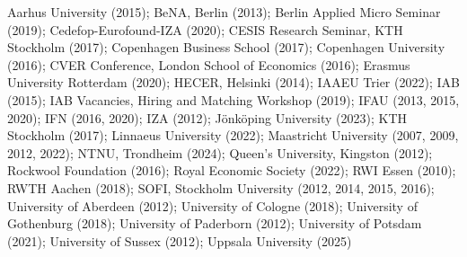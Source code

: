 Aarhus University (2015); BeNA, Berlin (2013); Berlin Applied Micro Seminar (2019); Cedefop-Eurofound-IZA (2020); CESIS Research Seminar, KTH Stockholm (2017); Copenhagen Business School (2017); Copenhagen University (2016); CVER Conference, London School of Economics (2016); Erasmus University Rotterdam (2020); HECER, Helsinki (2014); IAAEU Trier (2022); IAB (2015); IAB Vacancies, Hiring and Matching Workshop (2019); IFAU (2013, 2015, 2020); IFN (2016, 2020); IZA (2012); Jönköping University (2023); KTH Stockholm (2017); Linnaeus University (2022); Maastricht University (2007, 2009, 2012, 2022); NTNU, Trondheim (2024); Queen's University, Kingston (2012); Rockwool Foundation (2016); Royal Economic Society (2022); RWI Essen (2010); RWTH Aachen (2018); SOFI, Stockholm University (2012, 2014, 2015, 2016); University of Aberdeen (2012); University of Cologne (2018); University of Gothenburg (2018); University of Paderborn (2012); University of Potsdam (2021); University of Sussex (2012); Uppsala University (2025)%
